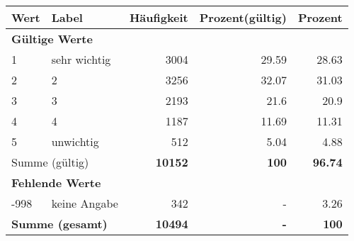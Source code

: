      \begin{longtable}{lXrrr}
     \toprule
     \textbf{Wert} & \textbf{Label} & \textbf{Häufigkeit} & \textbf{Prozent(gültig)} & \textbf{Prozent} \\
     \endhead
     \midrule
     \multicolumn{5}{l}{\textbf{Gültige Werte}}\\

     1 &
     \multicolumn{1}{X}{ sehr wichtig   } &


       \num{3004} &
       \num[round-mode=places,round-precision=2]{29.59} &
         \num[round-mode=places,round-precision=2]{28.63} \\

     2 &
     \multicolumn{1}{X}{ 2   } &


       \num{3256} &
       \num[round-mode=places,round-precision=2]{32.07} &
         \num[round-mode=places,round-precision=2]{31.03} \\

     3 &
     \multicolumn{1}{X}{ 3   } &


       \num{2193} &
       \num[round-mode=places,round-precision=2]{21.6} &
         \num[round-mode=places,round-precision=2]{20.9} \\

     4 &
     \multicolumn{1}{X}{ 4   } &


       \num{1187} &
       \num[round-mode=places,round-precision=2]{11.69} &
         \num[round-mode=places,round-precision=2]{11.31} \\

     5 &
     \multicolumn{1}{X}{ unwichtig   } &


       \num{512} &
       \num[round-mode=places,round-precision=2]{5.04} &
         \num[round-mode=places,round-precision=2]{4.88} \\
     \midrule
     \multicolumn{2}{l}{Summe (gültig)} &
       \textbf{\num{10152}} &
     \textbf{\num{100}} &
       \textbf{\num[round-mode=places,round-precision=2]{96.74}} \\
     \multicolumn{5}{l}{\textbf{Fehlende Werte}}\\
       -998 &
       keine Angabe &
         \num{342} &
        - &
         \num[round-mode=places,round-precision=2]{3.26} \\
     \midrule
     \multicolumn{2}{l}{\textbf{Summe (gesamt)}} &
          \textbf{\num{10494}} &
        \textbf{-} &
        \textbf{\num{100}} \\
     \bottomrule
     \end{longtable}
     
